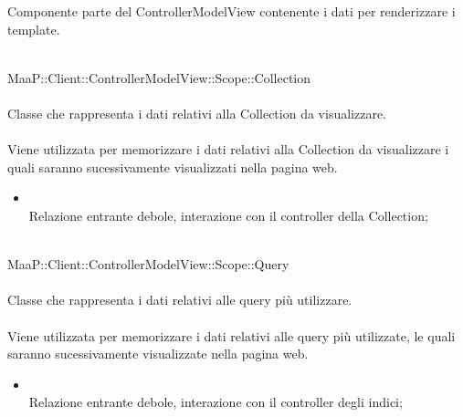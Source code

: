 Componente parte del ControllerModelView contenente i dati per renderizzare i template.

	\\
	MaaP::Client::ControllerModelView::Scope::Collection\\
	\\
	Classe che rappresenta i dati relativi alla Collection da visualizzare.\\
	\\
	Viene utilizzata per memorizzare i dati relativi alla Collection da visualizzare i quali saranno sucessivamente visualizzati nella pagina web.\\
	\begin{itemize}
	\item{}\\
	Relazione entrante debole, interazione con il controller della Collection;
	\end{itemize}
	
	\\
	MaaP::Client::ControllerModelView::Scope::Query\\
	\\
	Classe che rappresenta i dati relativi alle query più utilizzare.\\
	\\
	Viene utilizzata per memorizzare i dati relativi alle query più utilizzate, le quali saranno sucessivamente visualizzate nella pagina web.\\
	\begin{itemize}
	\item{}\\
	Relazione entrante debole, interazione con il controller degli indici;
	\end{itemize}
	
